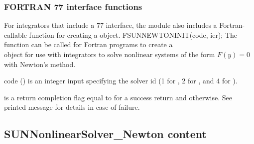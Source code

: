 \subsubsection*{FORTRAN 77 interface functions}
For {\sundials} integrators that include a {\F} 77 interface, the
{\sunnonlinsolnewton} module also includes a Fortran-callable
function for creating a  object.
%
%
{
  FSUNNEWTONINIT(code, ier);
}
{
  The function  can be called for Fortran programs
  to create a\\
   object for use with {\sundials}
  integrators to solve nonlinear systems of the form $F(y) = 0$ with
  Newton's method.
}
{
  \begin{args}[code]
  \item[code] ()
    is an integer input specifying the solver id (1 for {\cvode}, 2
    for {\ida}, and 4 for {\arkode}).
  \end{args}
}
{
   is a return completion flag equal to  for a success
  return and  otherwise. See printed message for details in case
  of failure.
}
{}


\subsection{SUNNonlinearSolver\_Newton content}
\label{ss:sunnonlinsolnewton_content}

